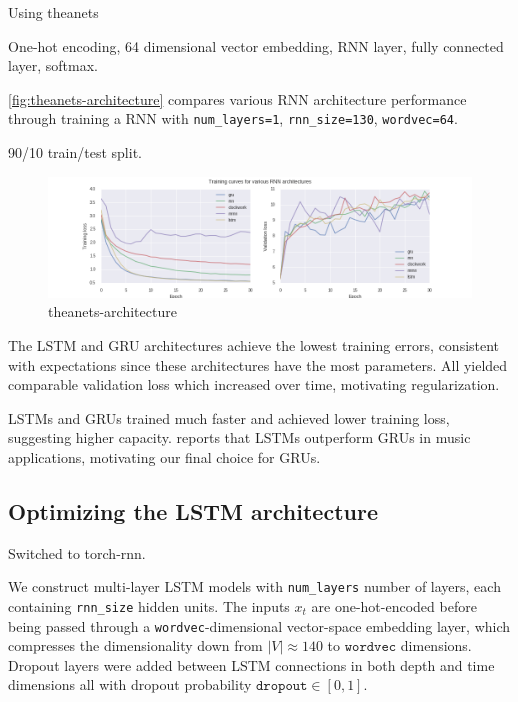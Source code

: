 \documentclass[dissertation.tex]{subfiles}
\begin{document}
Using theanets

One-hot encoding, 64 dimensional vector embedding, RNN layer, fully connected layer, softmax.

\autoref{fig:theanets-architecture} compares various RNN architecture performance
through training a RNN with \texttt{num\_layers=1}, \texttt{rnn\_size=130},
\texttt{wordvec=64}.

90/10 train/test split.

\begin{figure}[htpb]
    \centering
    \includegraphics[width=\linewidth]{Figures/theanets-architecture.png}
    \caption{theanets-architecture}
    \label{fig:theanets-architecture}
\end{figure}

The LSTM and GRU architectures achieve the lowest training errors, consistent with expectations
since these architectures have the most parameters.
All yielded comparable validation loss which increased over time, motivating regularization.

LSTMs and GRUs trained much faster and achieved lower training loss, suggesting higher capacity.
\cite{Nayebi2015} reports that LSTMs outperform GRUs in music applications, motivating
our final choice for GRUs.

\subsection{Optimizing the LSTM architecture}

Switched to torch-rnn. 

We construct multi-layer LSTM models with \texttt{num\_layers} number of
layers, each containing \texttt{rnn\_size} hidden units. The inputs $x_t$ are
one-hot-encoded before being passed through a \texttt{wordvec}-dimensional
vector-space embedding layer, which compresses the dimensionality down from
$|V| \approx 140$ to $\texttt{wordvec}$ dimensions. Dropout layers were added
between LSTM connections in both depth and time dimensions all with dropout
probability $\texttt{dropout} \in [0,1]$.
\end{document}
